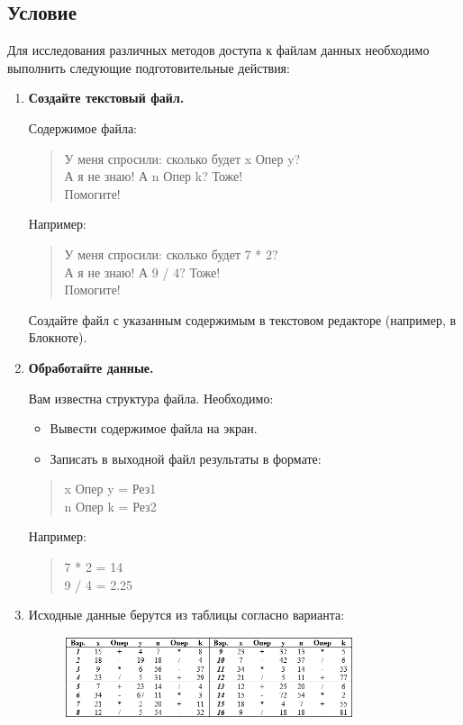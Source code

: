 \documentclass[14pt,a4paper]{article}
\begin{document}
\subsection{Условие}
Для исследования различных методов доступа к файлам данных необходимо выполнить следующие подготовительные действия:

\begin{enumerate}
\item \textbf{Создайте текстовый файл.}

Содержимое файла:
\begin{quote}
    У меня спросили: сколько будет x Опер y?\\
    А я не знаю! А n Опер k? Тоже!\\
    Помогите!
\end{quote}
Например:
\begin{quote}
    У меня спросили: сколько будет 7 * 2?\\
    А я не знаю! А 9 / 4? Тоже!\\
    Помогите!
\end{quote}
Создайте файл с указанным содержимым в текстовом редакторе (например, в Блокноте).

\item \textbf{Обработайте данные.}

Вам известна структура файла. Необходимо:
\begin{itemize}
    \item Вывести содержимое файла на экран.
    \item Записать в выходной файл результаты в формате:
\end{itemize}
\begin{quote}
    x Опер y = Рез1\\
    n Опер k = Рез2
\end{quote}
Например:
\begin{quote}
    7 * 2 = 14\\
    9 / 4 = 2.25
\end{quote}
\item Исходные данные берутся из таблицы согласно варианта:
\begin{figure}[h]
    \centering
    \includegraphics[width=0.8\textwidth]{data/condition15_1.png} %
\end{figure}
\end{enumerate}
\end{document}
